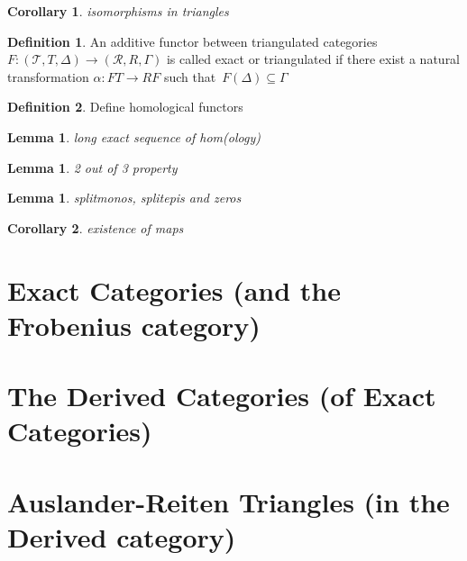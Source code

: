 \documentclass[12pt]{article}
\newtheorem{corollary}{Corollary}[theorem]
\newtheorem{lemma}[theorem]{Lemma}
\theoremstyle{definition}
\newtheorem{definition}{Definition}[section]
\theoremstyle{remark}
\begin{document}
        \begin{corollary}
            isomorphisms in triangles
        \end{corollary}

        \begin{definition}
            An additive functor between triangulated categories $F: (\mathcal{T}, T, \Delta) \rightarrow (\mathcal{R}, R, \Gamma)$ is called exact or triangulated if there exist a natural transformation $\alpha : FT \rightarrow RF$ such that $F(\Delta) \subseteq \Gamma$
        \end{definition}

        \begin{definition}
            Define homological functors
        \end{definition}

        \begin{lemma}
            long exact sequence of hom(ology)
        \end{lemma}

        \begin{lemma}
            2 out of 3 property
        \end{lemma}

        \begin{lemma}
            splitmonos, splitepis and zeros
        \end{lemma}

        \begin{corollary}
            existence of maps
        \end{corollary}
    \section{Exact Categories (and the Frobenius category)}
    \section{The Derived Categories (of Exact Categories)}
    \section{Auslander-Reiten Triangles (in the Derived category)}
\end{document}
